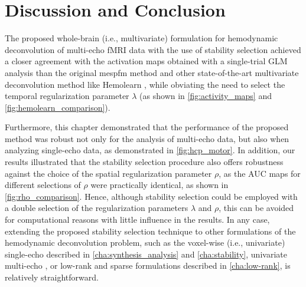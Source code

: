 \section{Discussion and Conclusion}
\label{sec:multivariate_discussion}

The proposed whole-brain (i.e., multivariate) formulation for hemodynamic
deconvolution of multi-echo fMRI data with the use of stability selection
achieved a closer agreement with the activation maps obtained with a
single-trial GLM analysis than the original \acrshort*{mespfm} method
\citep{CaballeroGaudes2019deconvolutionalgorithmmulti} and other
state-of-the-art multivariate deconvolution method like Hemolearn
\citep{Cherkaoui2021Multivariatesemiblind}, while obviating the need to select
the temporal regularization parameter $\lambda$ (as shown in
\cref{fig:activity_maps} and \cref{fig:hemolearn_comparison}). 

Furthermore, this chapter demonstrated that the performance of the proposed
method was robust not only for the analysis of multi-echo data, but also when
analyzing single-echo data, as demonstrated in \cref{fig:hcp_motor}. In
addition, our results illustrated that the stability selection procedure also
offers robustness against the choice of the spatial regularization parameter
$\rho$, as the AUC maps for different selections of $\rho$ were practically
identical, as shown in \cref{fig:rho_comparison}. Hence, although stability
selection could be employed with a double selection of the regularization
parameters $\lambda$ and $\rho$, this can be avoided for computational reasons
with little influence in the results. In any case, extending the proposed
stability selection technique to other formulations of the hemodynamic
deconvolution problem, such as the voxel-wise (i.e., univariate) single-echo
\citep{Gaudes2013Paradigmfreemapping,Urunuela2020StabilityBasedSparse} described
in \cref{cha:synthesis_analysis} and \cref{cha:stability}, univariate multi-echo
\citep{CaballeroGaudes2019deconvolutionalgorithmmulti}, or low-rank and sparse
formulations
\citep{Urunuela2021LowRankSparse,Cherkaoui2021Multivariatesemiblind} described
in \cref{cha:low-rank}, is relatively straightforward.

